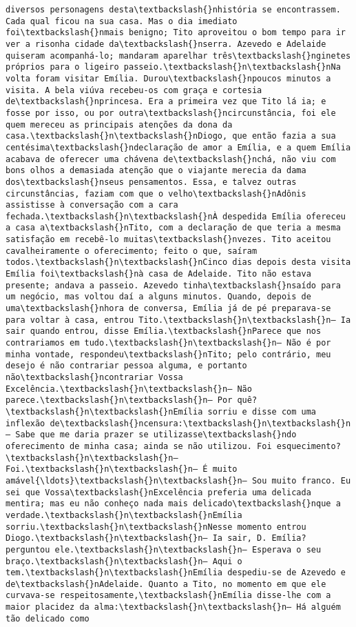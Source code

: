 \documentclass[11pt]{article}
\begin{document}
\begin{Verbatim}[commandchars=\\\{\}]
diversos personagens desta\textbackslash{}nhistória se encontrassem. Cada qual ficou na sua casa. Mas o dia imediato foi\textbackslash{}nmais benigno; Tito aproveitou o bom tempo para ir ver a risonha cidade da\textbackslash{}nserra. Azevedo e Adelaide quiseram acompanhá-lo; mandaram aparelhar três\textbackslash{}nginetes próprios para o ligeiro passeio.\textbackslash{}n\textbackslash{}nNa volta foram visitar Emília. Durou\textbackslash{}npoucos minutos a visita. A bela viúva recebeu-os com graça e cortesia de\textbackslash{}nprincesa. Era a primeira vez que Tito lá ia; e fosse por isso, ou por outra\textbackslash{}ncircunstância, foi ele quem mereceu as principais atenções da dona da casa.\textbackslash{}n\textbackslash{}nDiogo, que então fazia a sua centésima\textbackslash{}ndeclaração de amor a Emília, e a quem Emília acabava de oferecer uma chávena de\textbackslash{}nchá, não viu com bons olhos a demasiada atenção que o viajante merecia da dama dos\textbackslash{}nseus pensamentos. Essa, e talvez outras circunstâncias, faziam com que o velho\textbackslash{}nAdônis assistisse à conversação com a cara fechada.\textbackslash{}n\textbackslash{}nÀ despedida Emília ofereceu a casa a\textbackslash{}nTito, com a declaração de que teria a mesma satisfação em recebê-lo muitas\textbackslash{}nvezes. Tito aceitou cavalheiramente o oferecimento; feito o que, saíram todos.\textbackslash{}n\textbackslash{}nCinco dias depois desta visita Emília foi\textbackslash{}nà casa de Adelaide. Tito não estava presente; andava a passeio. Azevedo tinha\textbackslash{}nsaído para um negócio, mas voltou daí a alguns minutos. Quando, depois de uma\textbackslash{}nhora de conversa, Emília já de pé preparava-se para voltar à casa, entrou Tito.\textbackslash{}n\textbackslash{}n— Ia sair quando entrou, disse Emília.\textbackslash{}nParece que nos contrariamos em tudo.\textbackslash{}n\textbackslash{}n— Não é por minha vontade, respondeu\textbackslash{}nTito; pelo contrário, meu desejo é não contrariar pessoa alguma, e portanto não\textbackslash{}ncontrariar Vossa Excelência.\textbackslash{}n\textbackslash{}n— Não parece.\textbackslash{}n\textbackslash{}n— Por quê?\textbackslash{}n\textbackslash{}nEmília sorriu e disse com uma inflexão de\textbackslash{}ncensura:\textbackslash{}n\textbackslash{}n— Sabe que me daria prazer se utilizasse\textbackslash{}ndo oferecimento de minha casa; ainda se não utilizou. Foi esquecimento?\textbackslash{}n\textbackslash{}n— Foi.\textbackslash{}n\textbackslash{}n— É muito amável{\ldots}\textbackslash{}n\textbackslash{}n— Sou muito franco. Eu sei que Vossa\textbackslash{}nExcelência preferia uma delicada mentira; mas eu não conheço nada mais delicado\textbackslash{}nque a verdade.\textbackslash{}n\textbackslash{}nEmília sorriu.\textbackslash{}n\textbackslash{}nNesse momento entrou Diogo.\textbackslash{}n\textbackslash{}n— Ia sair, D. Emília? perguntou ele.\textbackslash{}n\textbackslash{}n— Esperava o seu braço.\textbackslash{}n\textbackslash{}n— Aqui o tem.\textbackslash{}n\textbackslash{}nEmília despediu-se de Azevedo e de\textbackslash{}nAdelaide. Quanto a Tito, no momento em que ele curvava-se respeitosamente,\textbackslash{}nEmília disse-lhe com a maior placidez da alma:\textbackslash{}n\textbackslash{}n— Há alguém tão delicado como 
\end{Verbatim}
\end{document}
